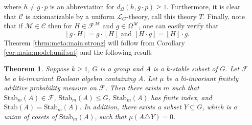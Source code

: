 \documentclass[11pt]{amsart}
\newtheorem{theorem}{Theorem}[section]
\theoremstyle{definition}
\theoremstyle{remark}
\begin{document}
where $ h \neq g\cdot p$ is an abbreviation for $d_\Omega(h,g\cdot p)\ge 1$. Furthermore, it is clear that $\mathscr{C}$ is axiomatizable by a uniform $\mathcal{L}_{G}$-theory, call this theory $T$. Finally, note that if $\mathcal{M} \in \mathscr{C}$ then for $H \in \mathcal{F}^{\mathcal{M}}$ and $g \in \Omega^\mathcal{M}$, one can easily verify that 
    \[
    [g\cdot H] = g \cdot[H] \mbox{ and } [H\cdot g] = [H]\cdot g.
    \]
Theorem \ref{thrm:meta:main:strong} will follow from Corollary \ref{cor:main:model:unif:sat} and the following result:
\begin{theorem}
\label{thrm:main:nonquant:strong}
Suppose $k \ge 1$, $G$ is a group and $A$ is a $k$-stable subset of $G$. Let $\mathcal{F}$ be a bi-invariant Boolean algebra containing $A$. Let $\mu$ be a bi-invariant finitely additive probability measure on $\mathcal{F}$. Then there exists $m$ such that $\mathrm{Stab}_m(A) \in \mathcal{F}$, $\mathrm{Stab}_m(A) \le G$, $\mathrm{Stab}_m(A)$ has finite index, and $\mathrm{Stab}(A) = \mathrm{Stab}_m(A)$. In addition,  there exists a subset $Y \subseteq G$, which is a union of cosets of $\mathrm{Stab}_m(A)$, such that $\mu(A \triangle Y ) =0$.
\end{theorem}
\end{document}
